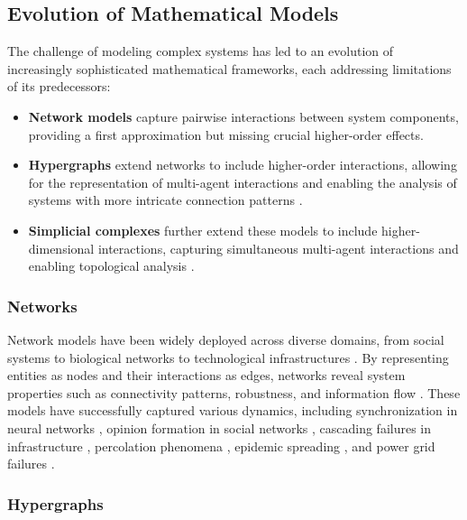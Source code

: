 \subsection{Evolution of Mathematical Models}

The challenge of modeling complex systems has led to an evolution of increasingly sophisticated mathematical frameworks, each addressing limitations of its predecessors:

\begin{itemize}[leftmargin=*]
  \item \textbf{Network models} capture pairwise interactions between system components, providing a first approximation but missing crucial higher-order effects.

  \item \textbf{Hypergraphs} extend networks to include higher-order interactions, allowing for the representation of multi-agent interactions and enabling the analysis of systems with more intricate connection patterns \citep{benson2016higher, battiston2020networks}.

  \item \textbf{Simplicial complexes} further extend these models to include higher-dimensional interactions, capturing simultaneous multi-agent interactions and enabling topological analysis \citep{battiston2020networks, petri2014homological}.
\end{itemize}

\subsubsection{Networks}

Network models have been widely deployed across diverse domains, from social systems to biological networks to technological infrastructures \citep{boccaletti2006complex, newman2003structure}. By representing entities as nodes and their interactions as edges, networks reveal system properties such as connectivity patterns, robustness, and information flow \citep{barabasi2004network}. These models have successfully captured various dynamics, including synchronization in neural networks \citep{arenas2008synchronization}, opinion formation in social networks \citep{castellano2009statistical}, cascading failures in infrastructure \citep{watts2002simple}, percolation phenomena \citep{cohen2010complex}, epidemic spreading \citep{pastor2015epidemic}, and power grid failures \citep{dobson2007complex}.

\subsubsection{Hypergraphs}

